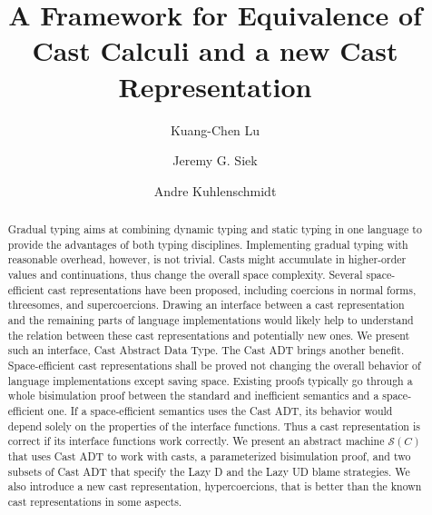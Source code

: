 \documentclass[runningheads]{llncs}
\newcommand{\SMachine}[1]{\ensuremath{\mathcal{S}(#1)}}
\begin{document}
%
\title{A Framework for Equivalence of Cast Calculi and a new Cast Representation}
%
%
\author{Kuang-Chen Lu \and
Jeremy G. Siek \and
Andre Kuhlenschmidt
}
%
%
%
\maketitle              %
%
\begin{abstract}
Gradual typing aims at combining dynamic typing and static typing in one 
language to provide the advantages of both typing disciplines. Implementing 
gradual typing with reasonable overhead, however, is not trivial. Casts might 
accumulate in higher-order values and continuations, thus change the overall 
space complexity. Several space-efficient cast representations have been 
proposed, including coercions in normal forms, threesomes, and supercoercions. 
Drawing an interface between a cast representation and the remaining parts of 
language implementations would likely help to understand the relation 
between these cast representations and potentially new ones. We present such an 
interface, Cast Abstract Data Type. The Cast ADT brings another 
benefit. Space-efficient cast representations shall be proved not changing the 
overall behavior of language implementations except saving space. Existing 
proofs typically go through a whole bisimulation proof between the standard and 
inefficient semantics and a space-efficient one. If a space-efficient semantics 
uses the Cast ADT, its behavior would depend solely on the properties of the 
interface functions. Thus a cast representation is correct if its interface 
functions work correctly. We present an abstract machine \SMachine{C} that uses 
Cast ADT to work with casts, a parameterized bisimulation proof, and two 
subsets of Cast ADT that specify the Lazy D and the Lazy UD blame strategies. We
also introduce a new cast representation, hypercoercions, that is better than 
the known cast representations in some aspects.


\end{abstract}
%
%
%
\end{document}
